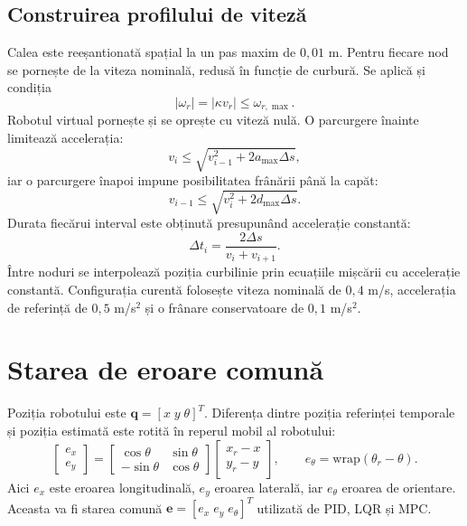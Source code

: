 \documentclass[12pt,a4paper]{article}
\begin{document}
\subsection{Construirea profilului de viteză}

Calea este reeșantionată spațial la un pas maxim de $0{,}01$ m. Pentru fiecare
nod se pornește de la viteza nominală, redusă în funcție de curbură. Se aplică
și condiția
\begin{equation}
  |\omega_r|=|\kappa v_r|\leq \omega_{r,\max}.
\end{equation}
Robotul virtual pornește și se oprește cu viteză nulă. O parcurgere înainte
limitează accelerația:
\begin{equation}
  v_i \leq \sqrt{v_{i-1}^{2}+2a_{\max}\Delta s},
\end{equation}
iar o parcurgere înapoi impune posibilitatea frânării până la capăt:
\begin{equation}
  v_{i-1} \leq \sqrt{v_i^{2}+2d_{\max}\Delta s}.
\end{equation}
Durata fiecărui interval este obținută presupunând accelerație constantă:
\begin{equation}
  \Delta t_i=\frac{2\Delta s}{v_i+v_{i+1}}.
\end{equation}
Între noduri se interpolează poziția curbilinie prin ecuațiile mișcării cu
accelerație constantă. Configurația curentă folosește viteza nominală de
$0{,}4$ m/s, accelerația de referință de $0{,}5$ m/s$^2$ și o frânare
conservatoare de $0{,}1$ m/s$^2$.

\section{Starea de eroare comună}

Poziția robotului este $\mathbf{q}=[x\;y\;\theta]^T$. Diferența dintre poziția
referinței temporale și poziția estimată este rotită în reperul mobil al
robotului:
\begin{equation}
\begin{bmatrix}e_x\\e_y\end{bmatrix}=
\begin{bmatrix}
\cos\theta & \sin\theta\\
-\sin\theta & \cos\theta
\end{bmatrix}
\begin{bmatrix}x_r-x\\y_r-y\end{bmatrix},
\qquad
e_{\theta}=\mathrm{wrap}(\theta_r-\theta).
\end{equation}
Aici $e_x$ este eroarea longitudinală, $e_y$ eroarea laterală, iar
$e_{\theta}$ eroarea de orientare. Aceasta va fi starea comună
$\mathbf{e}=[e_x\;e_y\;e_{\theta}]^T$ utilizată de PID, LQR și MPC.
\end{document}
